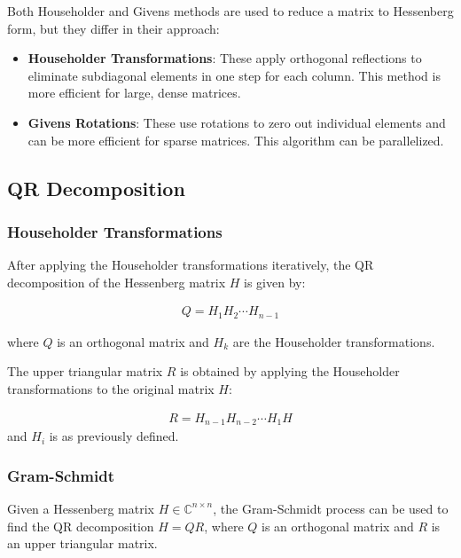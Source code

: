 \documentclass[12pt]{article}
\numberwithin{equation}{subsubsection}
\begin{document}
Both Householder and Givens methods are used to reduce a matrix to Hessenberg form, but they differ in their approach:
\begin{itemize}
	\item \textbf{Householder Transformations}: These apply orthogonal reflections to eliminate subdiagonal elements in one step for each column. This method is more efficient for large, dense matrices.
	\item \textbf{Givens Rotations}: These use rotations to zero out individual elements and can be more efficient for sparse matrices. This algorithm can be parallelized.
\end{itemize}

\subsection{QR Decomposition}

\subsubsection{Householder Transformations}
After applying the Householder transformations iteratively, the QR decomposition of the Hessenberg matrix $H$ is given by:

\begin{align}
	Q = H_1 H_2 \cdots H_{n-1}
\end{align}

where $ Q $ is an orthogonal matrix and $ H_k $ are the Householder transformations.

The upper triangular matrix $ R $ is obtained by applying the Householder transformations to the original matrix $ H $:

\begin{align}R = H_{n-1} H_{n-2} \cdots H_1 H\end{align}
and $H_i$ is as previously defined.

\subsubsection{Gram-Schmidt}
Given a Hessenberg matrix $ H \in \mathbb{C}^{n \times n} $, the Gram-Schmidt process can be used to find the QR decomposition $ H = QR $, where $ Q $ is an orthogonal matrix and $ R $ is an upper triangular matrix.
\end{document}
